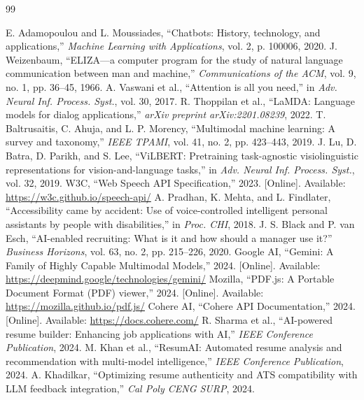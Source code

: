 \documentclass[12pt,a4paper]{report}
\begin{document}
\begin{thebibliography}{99}
 E. Adamopoulou and L. Moussiades, ``Chatbots: History, technology, and applications,'' \textit{Machine Learning with Applications}, vol. 2, p. 100006, 2020.
 J. Weizenbaum, ``ELIZA---a computer program for the study of natural language communication between man and machine,'' \textit{Communications of the ACM}, vol. 9, no. 1, pp. 36--45, 1966.
 A. Vaswani et al., ``Attention is all you need,'' in \textit{Adv. Neural Inf. Process. Syst.}, vol. 30, 2017.
 R. Thoppilan et al., ``LaMDA: Language models for dialog applications,'' \textit{arXiv preprint arXiv:2201.08239}, 2022.
 T. Baltrusaitis, C. Ahuja, and L. P. Morency, ``Multimodal machine learning: A survey and taxonomy,'' \textit{IEEE TPAMI}, vol. 41, no. 2, pp. 423--443, 2019.
 J. Lu, D. Batra, D. Parikh, and S. Lee, ``ViLBERT: Pretraining task-agnostic visiolinguistic representations for vision-and-language tasks,'' in \textit{Adv. Neural Inf. Process. Syst.}, vol. 32, 2019.
 W3C, ``Web Speech API Specification,'' 2023. [Online]. Available: \url{https://w3c.github.io/speech-api/}
 A. Pradhan, K. Mehta, and L. Findlater, ``Accessibility came by accident: Use of voice-controlled intelligent personal assistants by people with disabilities,'' in \textit{Proc. CHI}, 2018.
 J. S. Black and P. van Esch, ``AI-enabled recruiting: What is it and how should a manager use it?'' \textit{Business Horizons}, vol. 63, no. 2, pp. 215--226, 2020.
 Google AI, ``Gemini: A Family of Highly Capable Multimodal Models,'' 2024. [Online]. Available: \url{https://deepmind.google/technologies/gemini/}
 Mozilla, ``PDF.js: A Portable Document Format (PDF) viewer,'' 2024. [Online]. Available: \url{https://mozilla.github.io/pdf.js/}
 Cohere AI, ``Cohere API Documentation,'' 2024. [Online]. Available: \url{https://docs.cohere.com/}
 R. Sharma et al., ``AI-powered resume builder: Enhancing job applications with AI,'' \textit{IEEE Conference Publication}, 2024.
 M. Khan et al., ``ResumAI: Automated resume analysis and recommendation with multi-model intelligence,'' \textit{IEEE Conference Publication}, 2024.
 A. Khadilkar, ``Optimizing resume authenticity and ATS compatibility with LLM feedback integration,'' \textit{Cal Poly CENG SURP}, 2024.

\end{thebibliography}
\end{document}
